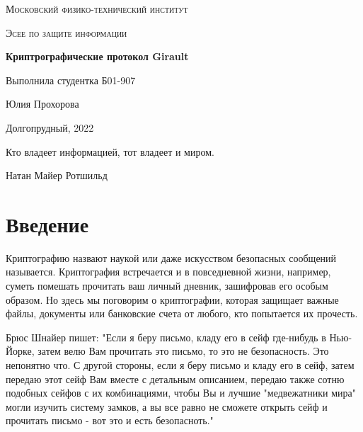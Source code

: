 \documentclass[a4paper]{article}
\begin{document}
\newcommand{\apple}{\char"F8FF}



\begin{titlepage}
    \vspace*{4cm}
	\centering
    {\scshape\LARGE Московский физико-технический институт\par}
	\vspace{1cm}
	{\scshape\Large Эсее по защите информации\par}
	\vspace{1cm}
    {\huge\bfseries  Криптрографические протокол Girault\par}
	\vspace{2cm}
	\vfill
\begin{flushright}
	{\large Выполнила студентка Б01-907}\par
	\vspace{0.3cm}
	{\LARGE Юлия Прохорова}
\end{flushright}
	
	\vfill
Долгопрудный, 2022
\end{titlepage}

\pagestyle{fancy} 
\fancyhead[C]{}
\fancyfoot[C]{ \noindent\rule{\textwidth}{0.4pt} \thepage }

\tableofcontents

\newpage

\epigraph{Кто владеет информацией, тот владеет и миром.}{Натан Майер Ротшильд}

\section{Введение}
Криптографию назвают наукой или даже искусством безопасных сообщений называется. Криптография встречается и в повседневной жизни, например, суметь помешать прочитать ваш личный дневник, зашифровав его особым образом. Но здесь мы поговорим о криптографии, которая защищает важные файлы, документы или банковские счета от любого, кто попытается их прочесть.
  \par
  \begin{displayquote}
    Брюс Шнайер пишет: "Если я беру письмо, кладу его в сейф где-нибудь в Нью-Йорке, затем велю Вам прочитать это письмо, то это не безопасность. Это непонятно что. С другой стороны,
  если я беру письмо и кладу его в сейф, затем передаю этот сейф Вам вместе с детальным описанием, передаю также сотню подобных сейфов
  с их комбинациями, чтобы Вы и лучшие "медвежатники мира" могли изучить систему замков, а вы все равно не сможете открыть сейф 
  и прочитать письмо - вот это и есть безопасноть." 
 \end{displayquote}
 
\end{document}
